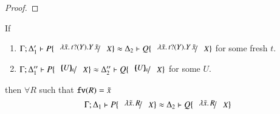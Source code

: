 \begin{proof}
\begin{comment}
			\Hby{\ell_2}& & &
			\newsp{\tilde{m_2'}}{Q_1'' \Par Q_3 \Par \appl{X}{\tilde{m}} \subst{\abs{\tilde{x}}{\binp{t}{Y} \appl{Y}{\tilde{x}}}}{X}} \\
			\hby{\bactinp{t}{\abs{\tilde{x}}{\binp{t'}{Y} \appl{Y}{\tilde{x}}}}}
			&\Delta_2''& \proves& \newsp{\tilde{m_2'}}{Q_1' \Par \appl{X}{\tilde{m}} \subst{\abs{\tilde{x}}{\binp{t'}{Y} \appl{Y}{\tilde{x}}}}{X}} \\
		\end{array}
	\]
%
%
	\noi From here the proof is similar with the previous case.
	\qed
\end{comment}
\end{proof}



\begin{lemma}\rm
	If 
%
	\begin{enumerate}
		\item	$\horel{\Gamma}{\Delta_1'}{P \subst{\abs{\tilde{x}}{\binp{t}{Y} \appl{Y}{\tilde{x}}}}{X}}{\wb}{\Delta_2}{Q \subst{\abs{\tilde{x}}{\binp{t}{Y} \appl{Y}{\tilde{x}}}}{X}}$
			for some fresh $t$.

		\item	$\horel{\Gamma}{\Delta_1''}{P \subst{\omapchar{U}}{X}}{\wb}{\Delta_2''}{Q \subst{\omapchar{U}}{X}}$
			for some $U$.
	\end{enumerate}
%
	then $\forall R$ such that $\mathtt{fv}(R) = \tilde{x}$
\[
	\horel{\Gamma}{\Delta_1}{P \subst{\abs{\tilde{x}}{R}}{X}}{\wb}{\Delta_2}{Q \subst{\abs{\tilde{x}}{R}}{X}}
\]
\end{lemma}


